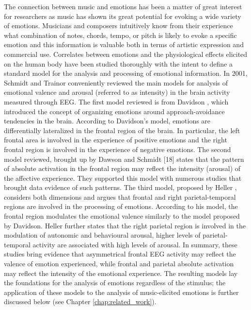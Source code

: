 The connection between music and emotions has been a matter of great interest for researchers as music has shown its great potential for evoking a wide variety of emotions. Musicians and composers intuitively know from their experience what combination of notes, chords, tempo, or pitch is likely to evoke a specific emotion and this information is valuable both in terms of artistic expression and commercial use. Correlates between emotions and the physiological effects elicited on the human body have been studied thoroughly with the intent to define a standard model for the analysis and processing of emotional information. In 2001, Schmidt and Trainor \cite{schmidt_frontal_2001} conveniently reviewed the main models for analysis of emotional valence and arousal (referred to as intensity) in the brain activity measured through EEG. The first model reviewed is from Davidson \cite{davidson_anterior_1992}, which introduced the concept of organizing emotions around approach-avoidance tendencies in the brain. According to Davidson’s model, emotions are differentially lateralized in the frontal region of the brain. In particular, the left frontal area is involved in the experience of positive emotions and the right frontal region is involved in the experience of negative emotions. The second model reviewed, brought up by Dawson \cite{dawson_frontal_1994} and Schmidt [18] states that the pattern of absolute activation in the frontal region may reflect the intensity (arousal) of the affective experience. They supported this model with numerous studies that brought data evidence of such patterns. The third model, proposed by Heller \cite{heller_neuropsychological_1993}, considers both dimensions and argues that frontal and right parietal-temporal regions are involved in the processing of emotions. According to his model, the frontal region modulates the emotional valence similarly to the model proposed by Davidson. Heller further states that the right parietal region is involved in the modulation of autonomic and behavioural arousal, higher levels of parietal-temporal activity are associated with high levels of arousal. In summary, these studies bring evidence that asymmetrical frontal EEG activity may reflect the valence of emotion experienced, while frontal and parietal absolute activation may reflect the intensity of the emotional experience. The resulting models lay the foundations for the analysis of emotions regardless of the stimulus; the application of these models to the analysis of music-elicited emotions is further discussed below (see Chapter \ref{chap:related_work}).

